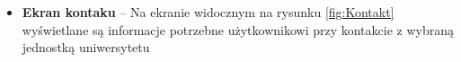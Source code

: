 \documentclass{iiuwb}
\begin{document}
\begin{itemize}
\item \textbf{Ekran kontaku} -- Na ekranie widocznym na rysunku \ref{fig:Kontakt} wyświetlane są informacje potrzebne użytkownikowi przy kontakcie z wybraną jednostką uniwersytetu                                                                                                                                                                                                                                                                                                                                                                                                                                                                                                                                                                                                                                                                                                                                                                                                                                                                                                                                                                                                                                                                                                                                                                                                                                                                                                                                                                                                                                                                                                                                                                                                                                                                                                                                                                                                                                                                                                                                                                                                                                                                                                                                                                                                                                                                                                                                                                                                                                                                                                                                                                                                                                                                                                                                                                                                                                                                                                                                                                                                                                                                                                                                     
\end{itemize}
\end{document}
